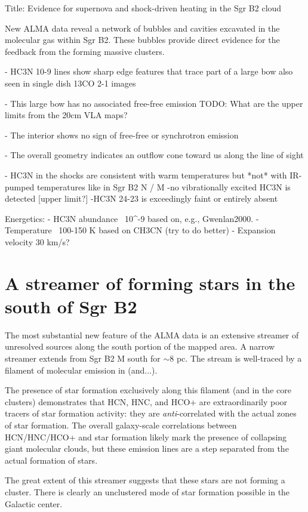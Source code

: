 
Title: Evidence for supernova and shock-driven heating in the Sgr B2 cloud

New ALMA data reveal a network of bubbles and cavities excavated in the
molecular gas within Sgr B2.  These bubbles provide direct evidence for
the feedback from the forming massive clusters.


- HC3N 10-9 lines show sharp edge features that trace part of a large bow also
  seen in single dish 13CO 2-1 images

  - This large bow has no associated free-free emission
    TODO: What are the upper limits from the 20cm VLA maps?

  - The interior shows no sign of free-free or synchrotron emission

  - The overall geometry indicates an outflow cone toward us along the line of
    sight

  - HC3N in the shocks are consistent with warm temperatures but *not* with
    IR-pumped temperatures like in Sgr B2 N / M
    -no vibrationally excited HC3N is detected [upper limit?]
    -HC3N 24-23 is exceedingly faint or entirely absent

Energetics:
- HC3N abundance ~10^-9 based on, e.g., Gwenlan2000.
- Temperature ~100-150 K based on CH3CN (try to do better)
- Expansion velocity 30 km/s?



\section{A streamer of forming stars in the south of Sgr B2}
The most substantial new feature of the ALMA data is an extensive streamer of
unresolved sources along the south portion of the mapped area.  A narrow
streamer extends from Sgr B2 M south for $\sim8$ pc.  The stream is well-traced
by a filament of molecular emission in \methylcyanide (and...).

The presence of star formation exclusively along this filament (and in the core
clusters) demonstrates that HCN, HNC, and HCO+ are extraordinarily poor tracers
of star formation activity: they are \emph{anti}-correlated with the actual
zones of star formation.  The overall galaxy-scale correlations between
HCN/HNC/HCO+ and star formation likely mark the presence of collapsing giant
molecular clouds, but these emission lines are a step separated from the actual
formation of stars.


The great extent of this streamer suggests that these stars are not forming a
cluster.  There is clearly an unclustered mode of star formation possible in
the Galactic center.
